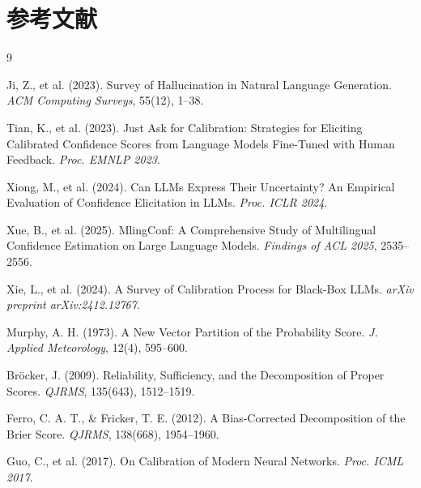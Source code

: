 \documentclass[10pt,a4paper,twocolumn]{article}
\begin{document}
\section*{参考文献}

\begin{thebibliography}{9}

Ji, Z., et al. (2023).
Survey of Hallucination in Natural Language Generation.
\textit{ACM Computing Surveys}, 55(12), 1--38.

Tian, K., et al. (2023).
Just Ask for Calibration: Strategies for Eliciting Calibrated Confidence Scores
from Language Models Fine-Tuned with Human Feedback.
\textit{Proc. EMNLP 2023}.

Xiong, M., et al. (2024).
Can LLMs Express Their Uncertainty? An Empirical Evaluation of Confidence
Elicitation in LLMs.
\textit{Proc. ICLR 2024}.

Xue, B., et al. (2025).
MlingConf: A Comprehensive Study of Multilingual Confidence Estimation on
Large Language Models.
\textit{Findings of ACL 2025}, 2535--2556.

Xie, L., et al. (2024).
A Survey of Calibration Process for Black-Box LLMs.
\textit{arXiv preprint arXiv:2412.12767}.

Murphy, A. H. (1973).
A New Vector Partition of the Probability Score.
\textit{J. Applied Meteorology}, 12(4), 595--600.

Bröcker, J. (2009).
Reliability, Sufficiency, and the Decomposition of Proper Scores.
\textit{QJRMS}, 135(643), 1512--1519.

Ferro, C. A. T., \& Fricker, T. E. (2012).
A Bias-Corrected Decomposition of the Brier Score.
\textit{QJRMS}, 138(668), 1954--1960.

Guo, C., et al. (2017).
On Calibration of Modern Neural Networks.
\textit{Proc. ICML 2017}.

\end{thebibliography}
\end{document}
